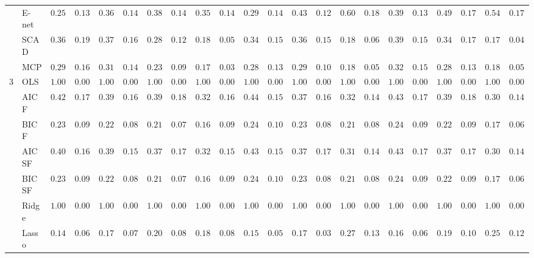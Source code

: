 \begin{tabular}{ll|ll|llllll|llllll|llllll}
 & E-net  & $0.2533$ & $0.1308$ & $0.3683$ & $0.1447$ & $0.3850$ & $0.1454$ & $0.3583$ & $0.1486$ & $0.2983$ & $0.1427$ & $0.4367$ & $0.1293$ & $0.6050$ & $0.1875$ & $0.3917$ & $0.1369$ & $0.4983$ & $0.1733$ & $0.5433$ & $0.1798$ \\
 & SCAD  & $0.3683$ & $0.1972$ & $0.3700$ & $0.1617$ & $0.2883$ & $0.1294$ & $0.1800$ & $0.0512$ & $0.3417$ & $0.1596$ & $0.3650$ & $0.1548$ & $0.1883$ & $0.0655$ & $0.3917$ & $0.1524$ & $0.3483$ & $0.1742$ & $0.1783$ & $0.0489$ \\
 & MCP  & $0.2983$ & $0.1680$ & $0.3100$ & $0.1461$ & $0.2300$ & $0.0999$ & $0.1750$ & $0.0365$ & $0.2867$ & $0.1383$ & $0.2917$ & $0.1095$ & $0.1867$ & $0.0594$ & $0.3250$ & $0.1542$ & $0.2833$ & $0.1330$ & $0.1800$ & $0.0512$ \\\hline
3 & OLS  & $1.0000$ & $0.0000$ & $1.0000$ & $0.0000$ & $1.0000$ & $0.0000$ & $1.0000$ & $0.0000$ & $1.0000$ & $0.0000$ & $1.0000$ & $0.0000$ & $1.0000$ & $0.0000$ & $1.0000$ & $0.0000$ & $1.0000$ & $0.0000$ & $1.0000$ & $0.0000$ \\
 & AIC F  & $0.4283$ & $0.1761$ & $0.3967$ & $0.1637$ & $0.3983$ & $0.1864$ & $0.3250$ & $0.1648$ & $0.4417$ & $0.1578$ & $0.3750$ & $0.1681$ & $0.3250$ & $0.1448$ & $0.4367$ & $0.1769$ & $0.3933$ & $0.1812$ & $0.3083$ & $0.1429$ \\
 & BIC F  & $0.2300$ & $0.0970$ & $0.2233$ & $0.0893$ & $0.2117$ & $0.0744$ & $0.1600$ & $0.0915$ & $0.2433$ & $0.1017$ & $0.2300$ & $0.0847$ & $0.2150$ & $0.0864$ & $0.2433$ & $0.0960$ & $0.2217$ & $0.0949$ & $0.1700$ & $0.0626$ \\
 & AIC SF  & $0.4083$ & $0.1630$ & $0.3900$ & $0.1539$ & $0.3783$ & $0.1722$ & $0.3200$ & $0.1583$ & $0.4367$ & $0.1549$ & $0.3750$ & $0.1714$ & $0.3117$ & $0.1415$ & $0.4383$ & $0.1751$ & $0.3783$ & $0.1786$ & $0.3000$ & $0.1421$ \\
 & BIC SF  & $0.2300$ & $0.0970$ & $0.2233$ & $0.0893$ & $0.2117$ & $0.0744$ & $0.1600$ & $0.0915$ & $0.2417$ & $0.1015$ & $0.2300$ & $0.0847$ & $0.2100$ & $0.0842$ & $0.2433$ & $0.0960$ & $0.2200$ & $0.0914$ & $0.1700$ & $0.0626$ \\
 & Ridge  & $1.0000$ & $0.0000$ & $1.0000$ & $0.0000$ & $1.0000$ & $0.0000$ & $1.0000$ & $0.0000$ & $1.0000$ & $0.0000$ & $1.0000$ & $0.0000$ & $1.0000$ & $0.0000$ & $1.0000$ & $0.0000$ & $1.0000$ & $0.0000$ & $1.0000$ & $0.0000$ \\
 & Lasso  & $0.1450$ & $0.0655$ & $0.1750$ & $0.0725$ & $0.2000$ & $0.0821$ & $0.1867$ & $0.0830$ & $0.1567$ & $0.0520$ & $0.1767$ & $0.0398$ & $0.2717$ & $0.1374$ & $0.1683$ & $0.0604$ & $0.1933$ & $0.1025$ & $0.2500$ & $0.1219$ \\

\end{tabular}
